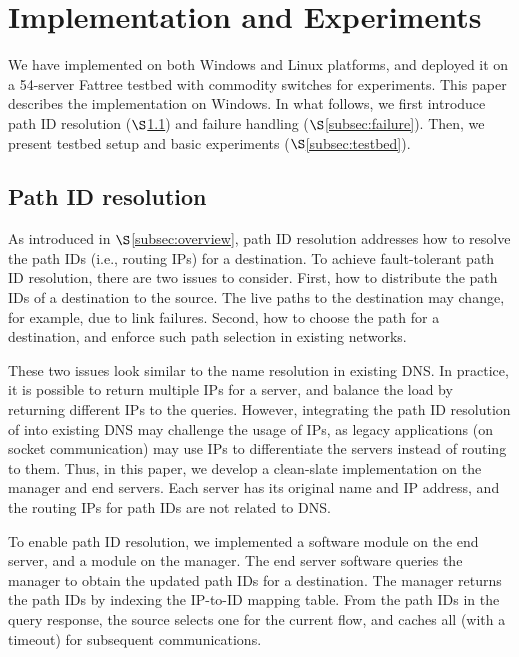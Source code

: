 \section{Implementation and Experiments}\label{sec:implementation}
We have implemented \sys on both Windows and Linux platforms, and deployed it on a 54-server Fattree testbed with commodity switches for experiments. This paper describes the implementation on Windows. In what follows, we first introduce path ID resolution ($\S$\ref{subsec:resolution}) and failure handling ($\S$\ref{subsec:failure}). Then, we present testbed setup and basic \sys experiments ($\S$\ref{subsec:testbed}).

\subsection{Path ID resolution}\label{subsec:resolution}
As introduced in $\S$\ref{subsec:overview}, path ID resolution addresses how to resolve the path IDs (i.e., routing IPs) for a destination. To achieve fault-tolerant path ID resolution, there are two issues to consider. First, how to distribute the path IDs of a destination to the source. The live paths to the destination may change, for example, due to link failures. Second, how to choose the path for a destination, and enforce such path selection in existing networks.

These two issues look similar to the name resolution in existing DNS. In practice, it is possible to return multiple IPs for a server, and balance the load by returning different IPs to the queries. However, integrating the path ID resolution of \sys into existing DNS may challenge the usage of IPs, as legacy applications (on socket communication) may use IPs to differentiate the servers instead of routing to them. Thus, in this paper, we develop a clean-slate \sys implementation on the \sys manager and end servers. Each server has its original name and IP address, and the routing IPs for path IDs are not related to DNS.

To enable path ID resolution, we implemented a \sys software module on the end server, and a module on the \sys manager. The end server \sys software queries the \sys manager to obtain the updated path IDs for a destination. The \sys manager returns the path IDs by indexing the IP-to-ID mapping table. From the path IDs in the query response, the source selects one for the current flow, and caches all (with a timeout) for subsequent communications.

